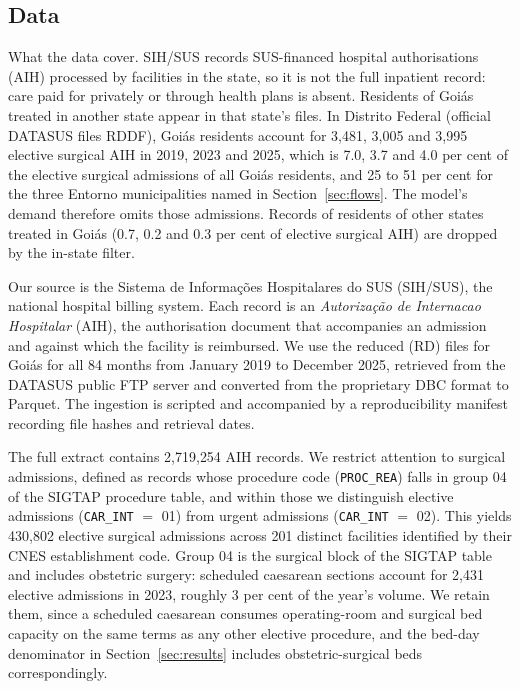 \subsection{Data}

What the data cover. SIH/SUS records SUS-financed hospital authorisations (AIH) processed by facilities in the
state, so it is not the full inpatient record: care paid for privately or through health plans is absent. Residents of
Goi\'as treated in another state appear in that state's files. In Distrito Federal (official DATASUS files RDDF), Goi\'as
residents account for 3{,}481, 3{,}005 and 3{,}995 elective surgical AIH in 2019, 2023 and 2025, which is 7.0, 3.7
and 4.0 per cent of the elective surgical admissions of all Goi\'as residents, and 25 to 51 per cent for the three Entorno
municipalities named in Section~\ref{sec:flows}. The model's demand therefore omits those admissions. Records of residents
of other states treated in Goi\'as (0.7, 0.2 and 0.3 per cent of elective surgical AIH) are dropped by the in-state filter.

Our source is the Sistema de Informa\c{c}\~oes Hospitalares do SUS (SIH/SUS), the
national hospital billing system. Each record is an \emph{Autoriza\c{c}\~ao de
Internacao Hospitalar} (AIH), the authorisation document that accompanies an
admission and against which the facility is reimbursed. We use the reduced
(RD) files for Goi\'as for all 84 months from January 2019 to December 2025,
retrieved from the DATASUS public FTP server and converted from the proprietary
DBC format to Parquet. The ingestion is scripted and accompanied by a
reproducibility manifest recording file hashes and retrieval dates.

The full extract contains 2{,}719{,}254 AIH records. We restrict attention to
surgical admissions, defined as records whose procedure code (\texttt{PROC\_REA})
falls in group 04 of the SIGTAP procedure table, and within those we
distinguish elective admissions (\texttt{CAR\_INT} $=$ 01) from urgent
admissions (\texttt{CAR\_INT} $=$ 02). This yields 430{,}802 elective surgical
admissions across 201 distinct facilities identified by their CNES
establishment code. Group 04 is the surgical block of the SIGTAP table and includes obstetric
surgery: scheduled caesarean sections account for 2{,}431 elective admissions in
2023, roughly 3 per cent of the year's volume. We retain them, since a scheduled
caesarean consumes operating-room and surgical bed capacity on the same terms as
any other elective procedure, and the bed-day denominator in
Section~\ref{sec:results} includes obstetric-surgical beds correspondingly.

